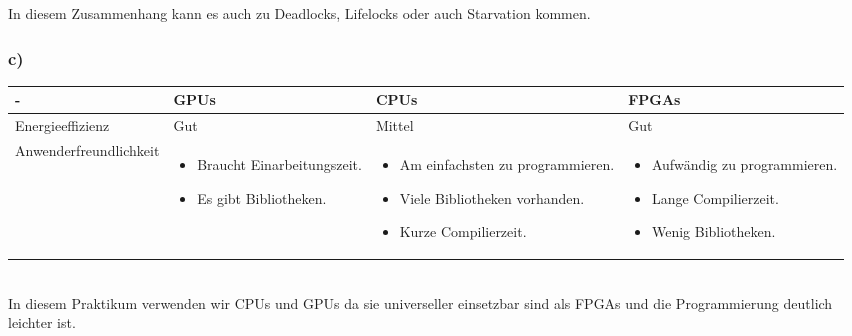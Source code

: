 \documentclass{article}
\begin{document}
        In diesem Zusammenhang kann es auch zu Deadlocks, Lifelocks oder auch Starvation kommen. 
        \subsubsection{c)}
        \begin{tabular}{|p{4cm}|p{3cm}|p{3cm}|p{3cm}|}
        	\hline
        	- & GPUs & CPUs & FPGAs \\
        	\hline
        	Energieeffizienz & Gut & Mittel & Gut  \\
        	\hline
        	Anwenderfreundlichkeit & \begin{itemize}
        		\item Braucht Einarbeitungszeit.
        		\item Es gibt Bibliotheken.
        	\end{itemize} & 
        \begin{itemize}
        	\item Am einfachsten zu programmieren.
        	\item Viele Bibliotheken vorhanden. 
        	\item Kurze Compilierzeit.
        \end{itemize}  & \begin{itemize}
        \item Aufwändig zu programmieren.
        \item Lange Compilierzeit.
        \item Wenig Bibliotheken.
    \end{itemize}  \\
        	\hline
        \end{tabular}\\
    
    In diesem Praktikum verwenden wir CPUs und GPUs da sie universeller einsetzbar sind als FPGAs und die Programmierung deutlich leichter ist.
\end{document}
